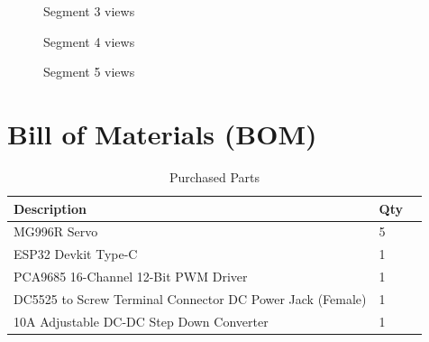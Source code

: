 \documentclass[a4paper,11pt]{article}
\begin{document}
\begin{figure}[H]
    \centering
    \begin{subfigure}{0.48\linewidth}
        \centering
         
        \label{fig:seg3_a}
    \end{subfigure}
    \hfill
    \begin{subfigure}{0.48\linewidth}
        \centering
         
        \label{fig:seg3_b}
    \end{subfigure}
    \caption{Segment 3 views}
    \label{fig:seg3}
\end{figure}

\begin{figure}[H]
    \centering
    \begin{subfigure}{0.48\linewidth}
        \centering
         
        \label{fig:seg4_a}
    \end{subfigure}
    \hfill
    \begin{subfigure}{0.48\linewidth}
        \centering
         
        \label{fig:seg4_b}
    \end{subfigure}
    \caption{Segment 4 views}
    \label{fig:seg4}
\end{figure}

\begin{figure}[H]
    \centering
     
    \caption{Segment 5 views}
    \label{fig:seg5}
\end{figure}


\newpage
\section{Bill of Materials (BOM)}
\begin{table}[H]
    \centering
    \caption{Purchased Parts}
    \label{tab:bom_pp}
    \begin{tabularx}{\textwidth}{@{} l X r @{}}
        \toprule
        \textbf{Description} & \textbf{Qty} \\
        \midrule
        MG996R Servo                                              & 5 \\
        ESP32 Devkit Type-C                                       & 1 \\
        PCA9685 16-Channel 12-Bit PWM Driver                      & 1 \\
        DC5525 to Screw Terminal Connector DC Power Jack (Female) & 1 \\
        10A Adjustable DC-DC Step Down Converter                  & 1 \\
        \bottomrule
    \end{tabularx}
\end{table}
\end{document}
